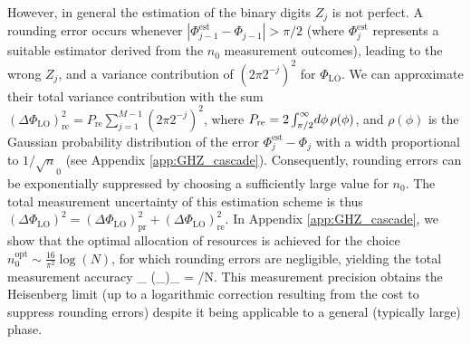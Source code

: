 However, in general the estimation of the binary digits $Z_j$ is not perfect.
A rounding error occurs whenever $|\Phi_{j-1}^\mathrm{est} - \Phi_{j-1}| > \pi/2$
(where $\Phi_j^\mathrm{est}$ represents a suitable estimator derived from the $n_0$
measurement outcomes), leading to the wrong $Z_j$, and a variance contribution
of $(2\pi 2^{-j})^2$ for $\Phi_\mathrm{LO}$.
We can approximate their total
variance contribution with the sum
 $ 	(\Delta\Phi_\mathrm{LO})^2_\mathrm{re} = P_\mathrm{re}\sum_{j=1}^{M-1}
 	(2\pi 2^{-j})^2
 $, where 
$P_\mathrm{re} = 2\intop_{\pi/2}^{\infty}\d{\phi}
\rho(\phi)$, 
and $\rho(\phi)$ is the Gaussian probability distribution of the error
$\Phi_j^\mathrm{est} - \Phi_j$ with a width proportional to $1/\sqrt n_0$  
(see Appendix \ref{app:GHZ_cascade}).
Consequently, rounding errors can be exponentially suppressed by choosing a
sufficiently large value for $n_0$. The total
measurement uncertainty of this estimation scheme is thus
$(\Delta\Phi_\mathrm{LO})^2 = (\Delta\Phi_\mathrm{LO})_\mathrm{pr}^2
+(\Delta\Phi_\mathrm{LO})_\mathrm{re}^2$.
In Appendix \ref{app:GHZ_cascade}, we show that the optimal allocation of
resources is achieved for the choice $n_{0}^{\mathrm{opt}} \sim
\frac{16}{\pi^2}\log\left(N\right)$, for which rounding errors are negligible,
yielding the total measurement accuracy
 \bel
 \label{eq:M}
\Delta\Phi_ \approx (\Delta\Phi_)_ =
/N.
\eel This measurement precision obtains the Heisenberg limit (up to a
logarithmic correction resulting from the cost to suppress rounding errors)
despite it being applicable to a general (typically large) phase.


